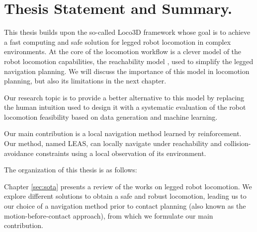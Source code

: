 \section{Thesis Statement and Summary.}


This thesis builds upon the so-called Loco3D framework \cite{loco3d, thesis_steve} whose goal is to achieve a fast computing and safe solution for legged robot locomotion in complex environments.
At the core of the locomotion workflow is a clever model of the robot locomotion capabilities, the reachability model \cite{RB-PRM}, used to simplify the legged navigation planning. We will discuss the importance of this model in locomotion planning, but also its limitations in the next chapter.

Our research topic is to provide a better alternative to this model by replacing the human intuition used to design it with a systematic evaluation of the robot locomotion feasibility based on data generation and machine learning.

Our main contribution is a local navigation method learned by reinforcement. 
Our method, named LEAS, can locally navigate under reachability and collision-avoidance constraints using a local observation of its environment.

\hfill \break

The organization of this thesis is as follows:

Chapter \ref{sec:sota} presents a review of the works on legged robot locomotion. 
We explore different solutions to obtain a safe and robust locomotion, leading us to our choice of a navigation method prior to contact planning (also known as the motion-before-contact approach), from which we formulate our main contribution.


